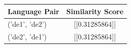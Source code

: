 \begin{tabular}{|l|c|}
\hline
Language Pair & Similarity Score \\
\hline
('de1', 'de2') & [[0.31285864]] \\
('de2', 'de1') & [[0.31285864]] \\
\hline
\end{tabular}

